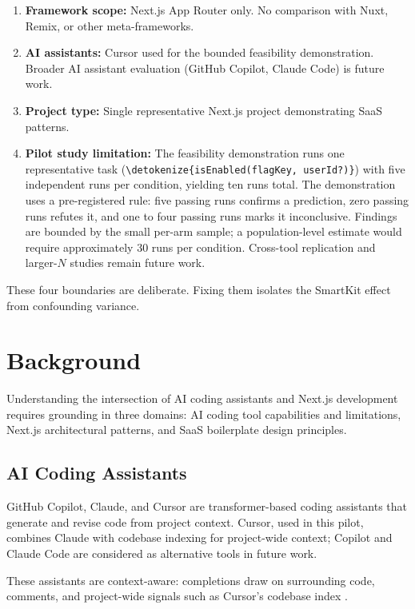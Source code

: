 \documentclass[12pt,a4paper]{report}
\newcommand{\code}[1]{\texttt{\nolinkurl{\detokenize{#1}}}}
\begin{document}
\begin{enumerate}
    \item \textbf{Framework scope:} Next.js App Router only. No comparison with Nuxt, Remix, or other meta-frameworks.
    \item \textbf{AI assistants:} Cursor used for the bounded feasibility demonstration. Broader AI assistant evaluation (GitHub Copilot, Claude Code) is future work.
    \item \textbf{Project type:} Single representative Next.js project demonstrating SaaS patterns.
    \item \textbf{Pilot study limitation:} The feasibility demonstration runs one representative task (\code{isEnabled(flagKey, userId?)}) with five independent runs per condition, yielding ten runs total. The demonstration uses a pre-registered rule: five passing runs confirms a prediction, zero passing runs refutes it, and one to four passing runs marks it inconclusive. Findings are bounded by the small per-arm sample; a population-level estimate would require approximately 30 runs per condition. Cross-tool replication and larger-$N$ studies remain future work.
\end{enumerate}

These four boundaries are deliberate. Fixing them isolates the SmartKit effect from confounding variance.


\chapter{Background}
\label{sec:background}

Understanding the intersection of AI coding assistants and Next.js development requires grounding in three domains: AI coding tool capabilities and limitations, Next.js architectural patterns, and SaaS boilerplate design principles.

\section{AI Coding Assistants}

GitHub Copilot, Claude, and Cursor are transformer-based coding assistants that generate and revise code from project context. Cursor, used in this pilot, combines Claude with codebase indexing for project-wide context; Copilot and Claude Code are considered as alternative tools in future work.

These assistants are context-aware: completions draw on surrounding code, comments, and project-wide signals such as Cursor's codebase index \parencite[code quality evaluation study]{yetistiren2023evaluating}.
\end{document}
